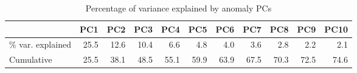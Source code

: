 \begin{table}
\caption{Percentage of variance explained by anomaly PCs}
\begin{tabular}{lrrrrrrrrrr}
\toprule
 & PC1 & PC2 & PC3 & PC4 & PC5 & PC6 & PC7 & PC8 & PC9 & PC10 \\
\midrule
\% var. explained & 25.5 & 12.6 & 10.4 & 6.6 & 4.8 & 4.0 & 3.6 & 2.8 & 2.2 & 2.1 \\
Cumulative & 25.5 & 38.1 & 48.5 & 55.1 & 59.9 & 63.9 & 67.5 & 70.3 & 72.5 & 74.6 \\
\bottomrule
\end{tabular}
\end{table}
